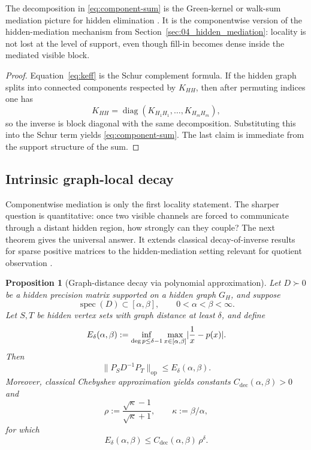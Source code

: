 \documentclass[11pt]{article}
\numberwithin{equation}{section}
\DeclarePairedDelimiter{\abs}{\lvert}{\rvert}
\DeclareMathOperator{\diag}{diag}
\theoremstyle{thmcompact}
\newtheorem{proposition}[theorem]{Proposition}
\theoremstyle{remark}
\begin{document}
The decomposition in \eqref{eq:component-sum} is the Green-kernel or walk-sum mediation picture for hidden elimination \cite{DoyleSnell1984,MalioutovJohnsonWillsky2006}. It is the componentwise version of the hidden-mediation mechanism from Section~\ref{sec:04_hidden_mediation}: locality is not lost at the level of support, even though fill-in becomes dense inside the mediated visible block.

\begin{proof}
Equation~\eqref{eq:keff} is the Schur complement formula. If the hidden graph splits into connected components respected by $K_{HH}$, then after permuting indices one has
\[
K_{HH}=\diag(K_{H_1H_1},\dots,K_{H_mH_m}),
\]
so the inverse is block diagonal with the same decomposition. Substituting this into the Schur term yields \eqref{eq:component-sum}. The last claim is immediate from the support structure of the sum.
\end{proof}

\subsection{Intrinsic graph-local decay}
\label{subsec:intrinsic-graph-local-decay}

Componentwise mediation is only the first locality statement. The sharper question is quantitative: once two visible channels are forced to communicate through a distant hidden region, how strongly can they couple? The next theorem gives the universal answer. It extends classical decay-of-inverse results for sparse positive matrices to the hidden-mediation setting relevant for quotient observation \cite{DemkoMossSmith1984,BenziGolub1999,BenziRazouk2007}.

\begin{proposition}[Graph-distance decay via polynomial approximation]\label{thm:chebyshev-decay}
Let $D\succ0$ be a hidden precision matrix supported on a hidden graph $G_H$, and suppose
\[
\operatorname{spec}(D)\subset[\alpha,\beta],
\qquad 0<\alpha<\beta<\infty.
\]
Let $S,T$ be hidden vertex sets with graph distance at least $\delta$, and define
\begin{equation}\label{eq:best-poly-error}
E_\delta(\alpha,\beta):=
\inf_{\deg p\le \delta-1}
\max_{x\in[\alpha,\beta]}\abs{\frac1x-p(x)}.
\end{equation}
Then
\begin{equation}\label{eq:chebyshev-decay}
\|P_S D^{-1} P_T\|_{\mathrm{op}}\le E_\delta(\alpha,\beta).
\end{equation}
Moreover, classical Chebyshev approximation yields constants $C_{\mathrm{dec}}(\alpha,\beta)>0$ and
\[
\rho:=\frac{\sqrt{\kappa}-1}{\sqrt{\kappa}+1},
\qquad \kappa:=\beta/\alpha,
\]
for which
\begin{equation}\label{eq:chebyshev-decay-exp}
E_\delta(\alpha,\beta)\le C_{\mathrm{dec}}(\alpha,\beta)\,\rho^\delta.
\end{equation}
\end{proposition}
\end{document}

